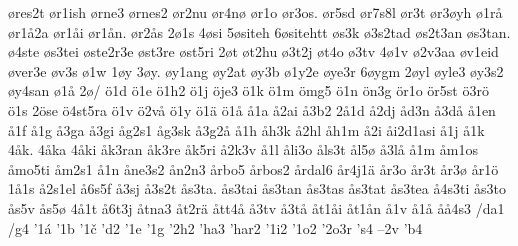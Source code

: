 {    øres2t
    ør1ish
    ørne3
    ørnes2
    ør2nu
    ør4nø
    ør1o
    ør3os.
    ør5sd
    ør7s8l
    ør3t
    ør3øyh
    ø1rå
    ør1å2a
    ør1åi
    ør1ån.
    ør2ås
    2ø1s
    4øsi
    5øsiteh
    6øsitehtt
    øs3k
    ø3s2tad
    øs2t3an
    øs3tan.
    ø4ste
    øs3tei
    øste2r3e
    øst3re
    øst5ri
    2øt
    øt2hu
    ø3t2j
    øt4o
    ø3tv
    4ø1v
    ø2v3aa
    øv1eid
    øver3e
    øv3s
    ø1w
    1øy
    3øy.
    øy1ang
    øy2at
    øy3b
    ø1y2e
    øye3r
    6øygm
    2øyl
    øyle3
    øy3s2
    øy4san
    ø1å
    2ø/
    ö1d
    ö1e
    ö1h2
    ö1j
    öje3
    ö1k
    ö1m
    ömg5
    ö1n
    ön3g
    ör1o
    ör5st
    ö3rö
    ö1s
    2öse
    ö4st5ra
    ö1v
    ö2vå
    ö1y
    ö1ä
    ö1å
    å1a
    å2ai
    å3b2
    2å1d
    å2dj
    åd3n
    å3då
    å1en
    å1f
    å1g
    å3ga
    å3gi
    åg2s1
    åg3sk
    å3g2å
    å1h
    åh3k
    å2hl
    åh1m
    å2i
    åi2d1asi
    å1j
    å1k
    4åk.
    4åka
    4åki
    åk3ran
    åk3re
    åk5ri
    å2k3v
    å1l
    åli3o
    åls3t
    ål5ø
    å3lå
    å1m
    åm1os
    åmo5ti
    åm2s1
    å1n
    åne3s2
    ån2n3
    årbo5
    årbos2
    årdal6
    år4j1ä
    år3o
    år3t
    år3ø
    år1ö
    1å1s
    å2s1el
    å6s5f
    å3sj
    å3s2t
    ås3ta.
    ås3tai
    ås3tan
    ås3tas
    ås3tat
    ås3tea
    å4s3ti
    ås3to
    ås5v
    ås5ø
    4å1t
    å6t3j
    åtna3
    åt2rä
    ått4å
    å3tv
    å3tå
    åt1åi
    åt1ån
    å1v
    å1å
    åå4s3
    /da1
    /g4
    '1á
    '1b
    '1č
    'd2
    '1e
    '1g
    '2h2
    'ha3
    'har2
    '1i2
    '1o2
    '2o3r
    's4
    –2v
    ’b4
}
